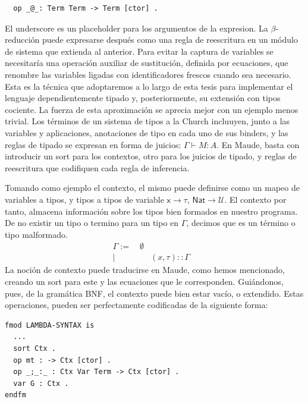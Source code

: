 \documentclass[a4paper,12pt]{report}
\theoremstyle{definition}
\theoremstyle{plain}
\theoremstyle{remark}
\begin{document}
\begin{lstlisting}
  op _@_: Term Term -> Term [ctor] .
\end{lstlisting}
El underscore es un placeholder para los argumentos de la expresion.
La $\beta$-reducci\'on puede expresarse despu\'es como una regla de reescritura en un m\'odulo de sistema que extienda al anterior. Para evitar la captura de variables se necesitar\'ia una operaci\'on auxiliar de sustituci\'on, definida por ecuaciones, que renombre las variables ligadas con identificadores frescos cuando sea necesario. Esta es la t\'ecnica que adoptaremos a lo largo de esta tesis para implementar el lenguaje dependientemente tipado y, posteriormente, su extensi\'on con tipos cociente.
\newline
\newline
La fuerza de esta aproximación se aprecia mejor con un ejemplo menos trivial. Los términos de un sistema de tipos a la Church incluuyen, junto a las variables y aplicaciones, anotaciones de tipo en cada uno de sus binders, y las reglas de tipado se expresan en forma de juicios: $\Gamma \vdash M : A$. En Maude, basta con introducir un sort para los contextos, otro para los juicios de tipado, y reglas de reescritura que codifiquen cada regla de inferencia.

Tomando como ejemplo el contexto, el mismo puede definirse como un mapeo de variables a tipos, y tipos a tipos de variable $\mathsf{x \to \tau}$, $\mathsf{Nat \to \mathcal{U}}$. El contexto por tanto, almacena información sobre los tipos bien formados en nuestro programa. De no existir un tipo o termino para un tipo en $\Gamma$, decimos que es un término o tipo malformado.
\begin{align}
  \Gamma := \quad \emptyset \\
  \mid \quad & (x, \tau) :: \Gamma &
\end{align}
La noción de contexto puede traducirse en Maude, como hemos mencionado, creando un sort para este y las ecuaciones que le corresponden. Guiándonos, pues, de la gramática BNF, el contexto puede bien estar vacío, o extendido. Estas operaciones, pueden ser perfectamente codificadas de la siguiente forma:
\begin{lstlisting}
fmod LAMBDA-SYNTAX is
  ...
  sort Ctx .
  op mt : -> Ctx [ctor] .
  op _;_:_ : Ctx Var Term -> Ctx [ctor] .
  var G : Ctx .
endfm
\end{lstlisting}
\end{document}
